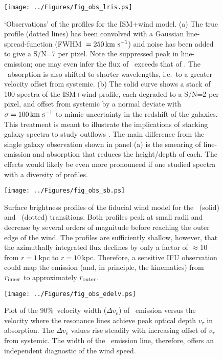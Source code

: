 \documentclass[12pt,preprint]{aastex}
\begin{document}
\begin{figure}
\texttt{[image: ../Figures/fig\_obs\_lris.ps]}
\caption{
`Observations' of the  profiles for the ISM+wind model.  
(a) The true profile (dotted lines) has been convolved with a
Gaussian line-spread-function (FWHM~$= 250 \, {\rm km~s^{-1}}$) and noise has been
added to give a S/N=7 per pixel.  Note the suppressed peak in 
line-emission; one may even infer the flux of \mgiia\ exceeds that of
\mgiib.  The \mgiia\ absorption is also shifted to
shorter wavelengths, i.e.\ to a greater velocity offset from systemic.  
(b) The solid curve shows a stack of 100 spectra of the ISM+wind
profile, each degraded to a S/N=2 per pixel, and offset from systemic
by a normal deviate with $\sigma = 100 \, {\rm km~s^{-1}}$ to mimic uncertainty in
the redshift of the galaxies.  
This treatment is meant to illustrate the
implications of stacking galaxy spectra to study outflows
\citep[e.g.][S10]{wcp+09,rwk+10}.   The main difference from the
single galaxy observation shown in panel (a) is the smearing of
line-emission and absorption that reduces the height/depth of each.
The effects would likely be even more pronounced if one studied spectra with
a diversity of  profiles.    
}
\label{fig:obs_lris}
\end{figure}

\begin{figure}
\texttt{[image: ../Figures/fig\_obs\_sb.ps]}
\caption{
Surface brightness profiles of the fiducial wind model for the \mgiia\
(solid) and \feiie\ (dotted) transitions.  Both profiles peak at small
radii and decrease by several orders of magnitude before reaching the
outer edge of the wind.  The profiles are sufficiently shallow,
however, that the azimuthally integrated flux declines by only a
factor of $\approx 10$ from $r = 1$\,kpc to $r=10$\,kpc.  Therefore, a
sensitive IFU observation could map the emission (and, in principle,
the kinematics) from $r_{\rm inner}$ to approximately $r_{\rm outer}$.
}
\label{fig:obs_sb}
\end{figure}

\begin{figure}
\texttt{[image: ../Figures/fig\_obs\_edelv.ps]}
\caption{
Plot of the 90\%\ velocity width ($\Delta v_e$) of \feiic\ emission versus the
velocity where the resonance lines achieve peak optical depth
$v_\tau$ in absorption.  The $\Delta v_e$ values rise steadily with
increasing offset of $v_\tau$ from systemic.  The width of the \feiic\
emission line, therefore, offers an independent diagnostic of the wind
speed.
}
\label{fig:obs_edelv}
\end{figure}
\end{document}
